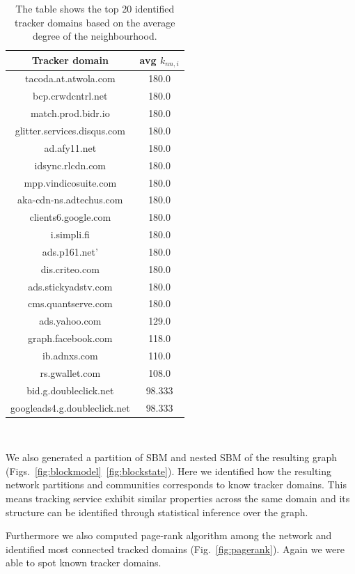 \begin{table}[h!]
\centering
\begin{tabular}{ || c | c || }
\hline
Tracker domain & avg $k_{nn,i}$ \\
\hline
\hline
tacoda.at.atwola.com & 180.0 \\
bcp.crwdcntrl.net & 180.0 \\
match.prod.bidr.io & 180.0 \\
glitter.services.disqus.com & 180.0 \\
ad.afy11.net & 180.0 \\
idsync.rlcdn.com &180.0 \\
mpp.vindicosuite.com & 180.0 \\
aka-cdn-ns.adtechus.com & 180.0 \\
clients6.google.com & 180.0 \\
i.simpli.fi & 180.0 \\
ads.p161.net' & 180.0 \\
dis.criteo.com & 180.0 \\
ads.stickyadstv.com & 180.0 \\
cms.quantserve.com & 180.0 \\
ads.yahoo.com & 129.0 \\
graph.facebook.com & 118.0 \\
ib.adnxs.com & 110.0 \\
rs.gwallet.com & 108.0 \\
bid.g.doubleclick.net & 98.333\\
googleads4.g.doubleclick.net & 98.333\\
\hline
\end{tabular}
\\[2.5pt]
\caption{\label{table:trackers} The table shows the top 20 identified tracker domains based on the average degree of the neighbourhood.}
\end{table}

We also generated a partition of SBM and nested SBM of the resulting graph (Figs.~\ref{fig:blockmodel}~\ref{fig:blockstate}). Here we identified how the resulting network partitions and communities corresponds to know tracker domains. This means tracking service exhibit similar properties across the same domain and its structure can be identified through statistical inference over the graph.

Furthermore we also computed page-rank algorithm among the network and identified most connected tracked domains (Fig.~\ref{fig:pagerank}). Again we were able to spot known tracker domains.

